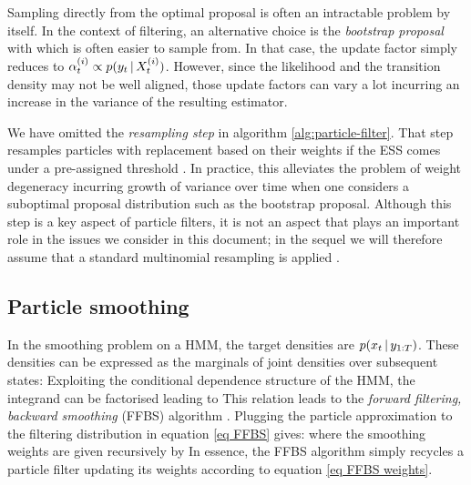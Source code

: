 Sampling directly from the optimal proposal is often an intractable problem by itself. In the context of filtering, an alternative choice is the \emph{bootstrap proposal} \citep{doucet11} with
which is often easier to sample from. In that case, the update factor simply reduces to $\alpha^{(i)}_t \propto p(y_t\,|\, X^{(i)}_t)$. However, since the likelihood and the transition density may not be well aligned, those update factors can vary a lot incurring an increase in the variance of the resulting estimator.

We have omitted the \emph{resampling step} in algorithm \ref{alg:particle-filter}. That step resamples particles with replacement based on their weights if the ESS comes under a pre-assigned threshold \citep{delmoral06}. In practice, this alleviates the problem of weight degeneracy incurring growth of variance over time when one considers a suboptimal proposal distribution such as the bootstrap proposal. Although this step is a key aspect of particle filters, it is not an aspect that plays an important role in the issues we consider in this document; in the sequel we will therefore assume that a standard multinomial resampling is applied \citep{hol06,doucet11}.

\subsection{\label{bg:particle-smoothing}Particle smoothing}

In the smoothing problem on a HMM, the target densities are $p(x_t\,|\, y_{1:T})$. These densities can be expressed as the marginals of joint densities over subsequent states: 
 Exploiting the conditional dependence structure of the HMM, the integrand can be factorised leading to
This relation leads to the \emph{forward filtering, backward smoothing} (FFBS) algorithm \citep{hurzeler98, doucet00}.
Plugging the particle approximation to the filtering distribution in equation \eqref{eq FFBS} gives:
where the smoothing weights are given recursively by
In essence, the FFBS algorithm simply recycles a particle filter updating its weights according to equation \eqref{eq FFBS weights}. 

